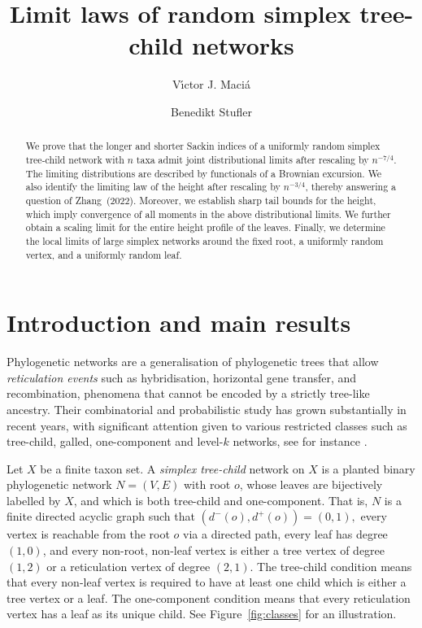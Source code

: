 \documentclass[english,11pt]{smfart}
\title{\textbf{Limit laws of random simplex tree-child networks}}
\date{}
\author{V\'{\i}ctor J. Maci\'a}
\author{Benedikt Stufler}
\numberwithin{equation}{section}
\begin{document}
		




\vspace {-0.5cm}

\begin{abstract}
We prove that the longer and shorter Sackin indices of a uniformly random simplex tree-child network with $n$ taxa admit joint distributional limits after rescaling by $n^{-7/4}$. The limiting distributions are described by functionals of a Brownian excursion. We also identify the limiting law of the height after rescaling by $n^{-3/4}$, thereby answering a question of Zhang~(2022). Moreover, we establish sharp tail bounds for the height, which imply convergence of all moments in the above distributional limits. We further obtain a scaling limit for the entire height profile of the leaves. Finally, we determine the local limits of large simplex networks around the fixed root, a uniformly random vertex, and a uniformly random leaf. 
\end{abstract}





\maketitle



\section{Introduction and main results}


Phylogenetic networks are a generalisation of phylogenetic trees that allow \emph{reticulation events} such as hybridisation, horizontal gene transfer, and recombination, phenomena that cannot be encoded by a strictly tree-like ancestry. Their combinatorial and probabilistic study has grown substantially in recent years, with significant attention given to various restricted classes such as tree-child, galled, one-component and level-$k$ networks, see for instance \cite{bienvenu2026b2indexgalledtrees,zbMATH07244280,zbMATH07751083,zbMATH07880797}.
\smallskip

Let $X$ be a finite taxon set. A \emph{simplex tree-child} network on $X$ is a planted binary phylogenetic network $N=(V,E)$ with root $o$, whose leaves are bijectively labelled by $X$, and which is both tree-child and one-component. That is, $N$ is a finite directed acyclic graph such that
$
    (d^-(o),d^+(o))=(0,1),
$
every vertex is reachable from the root $o$ via a directed path, every leaf has degree $(1,0)$, and every non-root, non-leaf vertex is either a tree vertex of degree $(1,2)$ or a reticulation vertex of degree $(2,1)$. The tree-child condition means that every non-leaf vertex is required to have at least one child which is either a tree vertex or a leaf. The one-component condition means that every reticulation vertex has a leaf as its unique child. See Figure~\ref{fig:classes} for an illustration.
\smallskip
\end{document}
